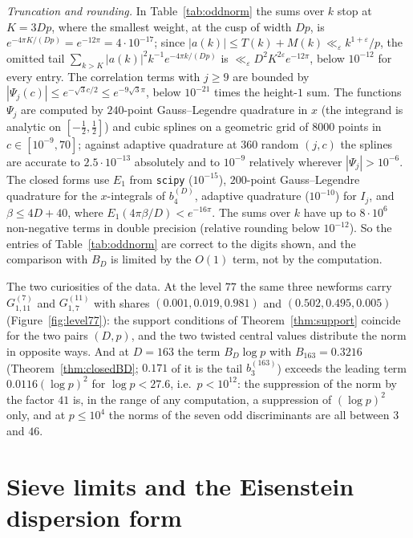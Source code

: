 \documentclass[11pt]{amsart}
\theoremstyle{remark}
\newcommand{\e}{\varepsilon}
\begin{document}
\emph{Truncation and rounding.} In Table~\ref{tab:oddnorm} the sums over $k$ stop at $K=3Dp$, where the smallest weight, at the cusp of width $Dp$, is $e^{-4\pi K/(Dp)}=e^{-12\pi}=4\cdot10^{-17}$; since $|a(k)|\le T(k)+M(k)\ll_\e k^{1+\e}/p$, the omitted tail $\sum_{k>K}|a(k)|^2k^{-1}e^{-4\pi k/(Dp)}$ is $\ll_\e D^2K^{2\e}e^{-12\pi}$, below $10^{-12}$ for every entry. The correlation terms with $j\ge9$ are bounded by $|\Psi_j(c)|\le e^{-\sqrt3c/2}\le e^{-9\sqrt3\pi}$, below $10^{-21}$ times the height-$1$ sum. The functions $\Psi_j$ are computed by $240$-point Gauss--Legendre quadrature in $x$ (the integrand is analytic on $[-\frac12,\frac12]$) and cubic splines on a geometric grid of $8000$ points in $c\in[10^{-9},70]$; against adaptive quadrature at $360$ random $(j,c)$ the splines are accurate to $2.5\cdot10^{-13}$ absolutely and to $10^{-9}$ relatively wherever $|\Psi_j|>10^{-6}$. The closed forms use $E_1$ from \texttt{scipy} ($10^{-15}$), $200$-point Gauss--Legendre quadrature for the $x$-integrals of $b_4^{(D)}$, adaptive quadrature ($10^{-10}$) for $I_j$, and $\beta\le4D+40$, where $E_1(4\pi\beta/D)<e^{-16\pi}$. The sums over $k$ have up to $8\cdot10^6$ non-negative terms in double precision (relative rounding below $10^{-12}$). So the entries of Table~\ref{tab:oddnorm} are correct to the digits shown, and the comparison with $B_D$ is limited by the $O(1)$ term, not by the computation.

The two curiosities of the data. At the level $77$ the same three newforms carry $G^{(7)}_{1,11}$ and $G^{(11)}_{1,7}$ with shares $(0.001,0.019,0.981)$ and $(0.502,0.495,0.005)$ (Figure~\ref{fig:level77}): the support conditions of Theorem~\ref{thm:support} coincide for the two pairs $(D,p)$, and the two twisted central values distribute the norm in opposite ways. And at $D=163$ the term $B_D\log p$ with $B_{163}=0.3216$ (Theorem~\ref{thm:closedBD}; $0.171$ of it is the tail $b_3^{(163)}$) exceeds the leading term $0.0116(\log p)^2$ for $\log p<27.6$, i.e.\ $p<10^{12}$: the suppression of the norm by the factor $41$ is, in the range of any computation, a suppression of $(\log p)^2$ only, and at $p\le10^4$ the norms of the seven odd discriminants are all between $3$ and $46$.

\section{Sieve limits and the Eisenstein dispersion form}\label{sec:eis}
\end{document}
